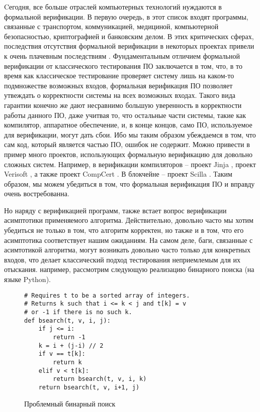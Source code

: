 Cегодня, все больше отраслей компьютерных технологий нуждаются в формальной верификации. В первую очередь, в этот список входят программы,
связанные с транспортом, коммуникацией, медициной, компьютерной безопасностью, криптографией и банковским делом.
В этих критических сферах,
последствия отсутствия формальной верификации в некоторых проектах привели к очень плачевным последствиям \cite{horror}.
Фундаментальным отличием формальной верификации от классического тестирования ПО заключается в том, что, в то время как классическое
тестирование проверяет систему лишь на каком-то подмножестве возможных входов, формальная верификация ПО позволяет утвеждать о
корректности системы на всех возможных входах. Такого вида гарантии конечно же дают несравнимо большую уверенность в корректности
работы данного ПО, даже учитвая то, что остальные части системы, такие как компилятор, аппаратное обеспечение, и,
в конце концов, само ПО, используемое для верификации, могут дать сбои. Ибо мы таким образом убеждаемся в том, что сам код, который
является частью ПО, ошибок не содержит. Можно привести в пример много проектов, использующих формальную верификацию для довольно сложных
систем. Например, в верификации компиляторов -- проект Jinja \cite{KleinN-TCS,KleinN-ACM}, проект Verisoft
\cite{Strecker_compilerverification,Leinenbach}, а также проект CompCert \cite{Xavier,CompCert}.
В блокчейне -- проект Scilla \cite{sergey2018scilla}. Таким образом, мы можем убедиться в том, что формальная верификация ПО
и вправду очень востребованна.
\par
Но наряду с верификацией программ, также встает вопрос верификации асимптотики применяемого алгоритма. Действительно, довольно часто
мы хотим убедиться не только в том, что алгоритм корректен, но также и в том, что его асимптотика соответствует нашим ожиданиям.
На самом деле, баги, связанные с асимтотикой алгоритма, могут возникать довольно часто только для конкретных входов, что делает
классический подход тестирования неприемлемым для их отыскания. например, рассмотрим следующую реализацию бинарного поиска
(на языке Python).
\pagebreak
\begin{figure}[H]
    \caption{Проблемный бинарный поиск}
    \label{code:bsearch}
    \begin{verbatim}
# Requires t to be a sorted array of integers.
# Returns k such that i <= k < j and t[k] = v
# or -1 if there is no such k.
def bsearch(t, v, i, j):
    if j <= i:
        return -1
    k = i + (j-i) // 2
    if v == t[k]:
        return k
    elif v < t[k]:
        return bsearch(t, v, i, k)
    return bsearch(t, v, i+1, j)
\end{verbatim}
\end{figure}
